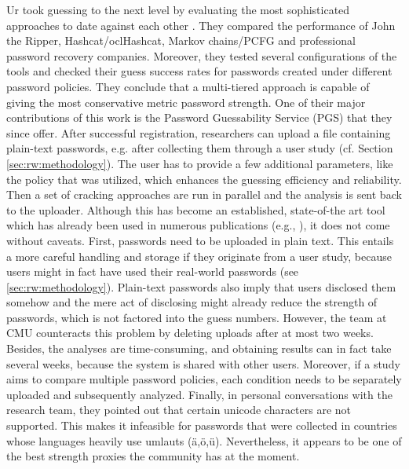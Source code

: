 	Ur \etal took guessing to the next level by evaluating the most sophisticated approaches to date against each other \cite{Ur2015MeasuringRealWorldAccuracies}. They compared the performance of John the Ripper, Hashcat/oclHashcat, Markov chains/PCFG and professional password recovery companies. Moreover, they tested several configurations of the tools and checked their guess success rates for passwords created under different password policies. They conclude that a multi-tiered approach is capable of giving the most conservative metric password strength. One of their major contributions of this work is the Password Guessability Service (PGS) that they since offer. After successful registration, researchers can upload a file containing plain-text passwords, e.g. after collecting them through a user study (cf. Section \ref{sec:rw:methodology}). The user has to provide a few additional parameters, like the policy that was utilized, which enhances the guessing efficiency and reliability. Then a set of cracking approaches are run in parallel and the analysis is sent back to the uploader. 
	Although this has become an established, state-of-the art tool which has already been used in numerous publications (e.g., \cite{Gross2016CognitiveDepletion, Habib2017Blacklists, Mcevoy2016ContextualizingMnemonicPhrase, Segreti2017AdaptivePolicies, Ur2017DataDrivenPWMeter, Wheeler2016zxcvbn}), it does not come without caveats. First, passwords need to be uploaded in plain text. This entails a more careful handling and storage if they originate from a user study, because users might in fact have used their real-world passwords (see \ref{sec:rw:methodology}). Plain-text passwords also imply that users disclosed them somehow and the mere act of disclosing might already reduce the strength of passwords, which is not factored into the guess numbers. However, the team at CMU counteracts this problem by deleting uploads after at most two weeks. Besides, the analyses are time-consuming, and obtaining results can in fact take several weeks, because the system is shared with other users. Moreover, if a study aims to compare multiple password policies, each condition needs to be separately uploaded and subsequently analyzed. Finally, in personal conversations with the research team, they pointed out that certain unicode characters are not supported. This makes it infeasible for passwords that were collected in countries whose languages heavily use umlauts (ä,ö,ü). Nevertheless, it appears to be one of the best strength proxies the community has at the moment. 

